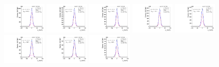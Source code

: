\begin{figure}[htb]
\includegraphics[width=0.19\textwidth]{plots/Appendix_Recoil_Fits/WmpMC_PF_13TeV_2G/pfu2fit_16.pdf}
\includegraphics[width=0.19\textwidth]{plots/Appendix_Recoil_Fits/WmpMC_PF_13TeV_2G/pfu2fit_17.pdf}
\includegraphics[width=0.19\textwidth]{plots/Appendix_Recoil_Fits/WmpMC_PF_13TeV_2G/pfu2fit_18.pdf}
\includegraphics[width=0.19\textwidth]{plots/Appendix_Recoil_Fits/WmpMC_PF_13TeV_2G/pfu2fit_19.pdf}
\includegraphics[width=0.19\textwidth]{plots/Appendix_Recoil_Fits/WmpMC_PF_13TeV_2G/pfu2fit_20.pdf}
\includegraphics[width=0.19\textwidth]{plots/Appendix_Recoil_Fits/WmpMC_PF_13TeV_2G/pfu2fit_21.pdf}
\includegraphics[width=0.19\textwidth]{plots/Appendix_Recoil_Fits/WmpMC_PF_13TeV_2G/pfu2fit_22.pdf}
\includegraphics[width=0.19\textwidth]{plots/Appendix_Recoil_Fits/WmpMC_PF_13TeV_2G/pfu2fit_23.pdf}

\end{figure}
